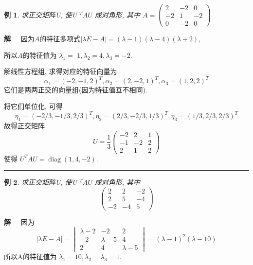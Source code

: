 \documentclass[13pt]{beamer}
\newtheorem{exa}{例}
\def\qed{\nopagebreak\hfill{\rule{4pt}{7pt}}\medbreak}
\def\sol{{\bf 解~~ }}
\begin{document}
\begin{frame}
\begin{exa}
求正交矩阵U, 使U $^{T} A U$ 成对角形, 其中 $A = \left(\begin{array}{ccc}2 & -2 & 0 \\ -2 & 1 & -2 \\ 0 & -2 & 0\end{array}\right)$
\end{exa}
\pause
\sol 因为$A$的特征多项式$|\lambda E - A |=(\lambda-1)(\lambda-4)(\lambda+2),$ 

所以$A$的特征值为 $\lambda_{1}=$ $1, \lambda_{2}=4, \lambda_{3}=-2 .$ 

解线性方程组, 求得对应的特征向量为
\[
\alpha_{1}=(-2,-1,2)^{T}, \alpha_{2}=(2,-2,1)^{T}, \alpha_{3}=(1,2,2)^{T}
\]
它们是两两正交的向量组(因为特征值互不相同).
\end{frame}

\begin{frame}
将它们单位化, 可得
\[
\eta_{1}=(-2 / 3,-1 / 3,2 / 3)^{T}, \eta_{2}=(2 / 3,-2 / 3,1 / 3)^{T}, \eta_{3}=(1 / 3,2 / 3,2 / 3)^{T}
\]
故得正交矩阵
\[
U=\frac{1}{3}\left(\begin{array}{ccc}
-2 & 2 & 1 \\
-1 & -2 & 2 \\
2 & 1 & 2
\end{array}\right)
\]
使得 $U^{T} A U=\operatorname{diag}(1,4,-2)$.
\qed
\end{frame}


\begin{frame}
\begin{exa}
	求正交矩阵U, 使U $^{T} A U$ 成对角形, 其中 
	$$
	\left(\begin{array}{ccc}
	2 & 2 & -2 \\
	2 & 5 & -4 \\
	-2 & -4 & 5
	\end{array}\right)
	$$
\end{exa}
\pause
\sol 
 因为
\[
|\lambda E-A|= \begin{vmatrix}
\lambda-2 & -2 & 2 \\
-2 & \lambda-5 & 4 \\
2 & 4 & \lambda-5
\end{vmatrix}=(\lambda-1)^{2}(\lambda-10)
\]
所以A的特征值为 $\lambda_{1}=10, \lambda_{2}=\lambda_{3}=1$.
\end{frame}
\end{document}
